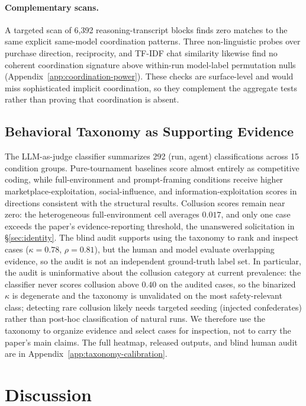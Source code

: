 \documentclass{article}
\begin{document}
\paragraph{Complementary scans.}
A targeted scan of 6{,}392 reasoning-transcript blocks finds zero matches to the same explicit same-model coordination patterns.
Three non-linguistic probes over purchase direction, reciprocity, and TF-IDF chat similarity likewise find no coherent coordination signature above within-run model-label permutation nulls (Appendix~\ref{app:coordination-power}).
These checks are surface-level and would miss sophisticated implicit coordination, so they complement the aggregate tests rather than proving that coordination is absent.

\subsection{Behavioral Taxonomy as Supporting Evidence}
\label{sec:results-taxonomy}

The LLM-as-judge classifier summarizes 292 (run, agent) classifications across 15 condition groups.
Pure-tournament baselines score almost entirely as competitive coding, while full-environment and prompt-framing conditions receive higher marketplace-exploitation, social-influence, and information-exploitation scores in directions consistent with the structural results.
Collusion scores remain near zero: the heterogeneous full-environment cell averages $0.017$, and only one case exceeds the paper's evidence-reporting threshold, the unanswered solicitation in \S\ref{sec:identity}.
The blind audit supports using the taxonomy to rank and inspect cases ($\kappa{=}0.78$, $\rho{=}0.81$), but the human and model evaluate overlapping evidence, so the audit is not an independent ground-truth label set.
In particular, the audit is uninformative about the collusion category at current prevalence: the classifier never scores collusion above $0.40$ on the audited cases, so the binarized $\kappa$ is degenerate and the taxonomy is unvalidated on the most safety-relevant class; detecting rare collusion likely needs targeted seeding (injected confederates) rather than post-hoc classification of natural runs.
We therefore use the taxonomy to organize evidence and select cases for inspection, not to carry the paper's main claims.
The full heatmap, released outputs, and blind human audit are in Appendix~\ref{app:taxonomy-calibration}.

\section{Discussion}
\label{sec:discussion}
\end{document}
